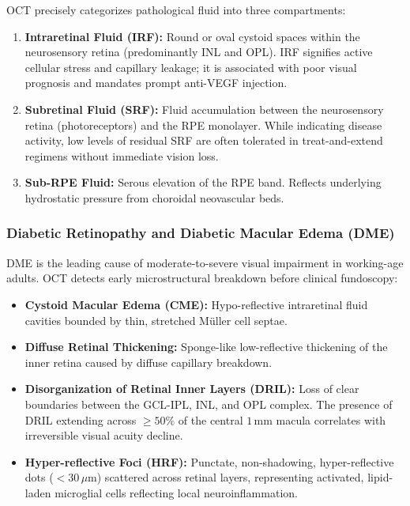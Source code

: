 \documentclass[11pt,a4paper]{article}
\begin{document}
\begin{clinicalpearl}
OCT precisely categorizes pathological fluid into three compartments:
\begin{enumerate}[leftmargin=*]
    \item \textbf{Intraretinal Fluid (IRF):} Round or oval cystoid spaces within the neurosensory retina (predominantly INL and OPL). IRF signifies active cellular stress and capillary leakage; it is associated with poor visual prognosis and mandates prompt anti-VEGF injection.
    \item \textbf{Subretinal Fluid (SRF):} Fluid accumulation between the neurosensory retina (photoreceptors) and the RPE monolayer. While indicating disease activity, low levels of residual SRF are often tolerated in treat-and-extend regimens without immediate vision loss.
    \item \textbf{Sub-RPE Fluid:} Serous elevation of the RPE band. Reflects underlying hydrostatic pressure from choroidal neovascular beds.
\end{enumerate}
\end{clinicalpearl}

\subsubsection{Diabetic Retinopathy and Diabetic Macular Edema (DME)}
DME is the leading cause of moderate-to-severe visual impairment in working-age adults. OCT detects early microstructural breakdown before clinical fundoscopy:
\begin{itemize}[leftmargin=*]
    \item \textbf{Cystoid Macular Edema (CME):} Hypo-reflective intraretinal fluid cavities bounded by thin, stretched Müller cell septae.
    \item \textbf{Diffuse Retinal Thickening:} Sponge-like low-reflective thickening of the inner retina caused by diffuse capillary breakdown.
    \item \textbf{Disorganization of Retinal Inner Layers (DRIL):} Loss of clear boundaries between the GCL-IPL, INL, and OPL complex. The presence of DRIL extending across $\ge 50\%$ of the central $1\,\text{mm}$ macula correlates with irreversible visual acuity decline.
    \item \textbf{Hyper-reflective Foci (HRF):} Punctate, non-shadowing, hyper-reflective dots ($< 30\,\mu\text{m}$) scattered across retinal layers, representing activated, lipid-laden microglial cells reflecting local neuroinflammation.
\end{itemize}
\end{document}
